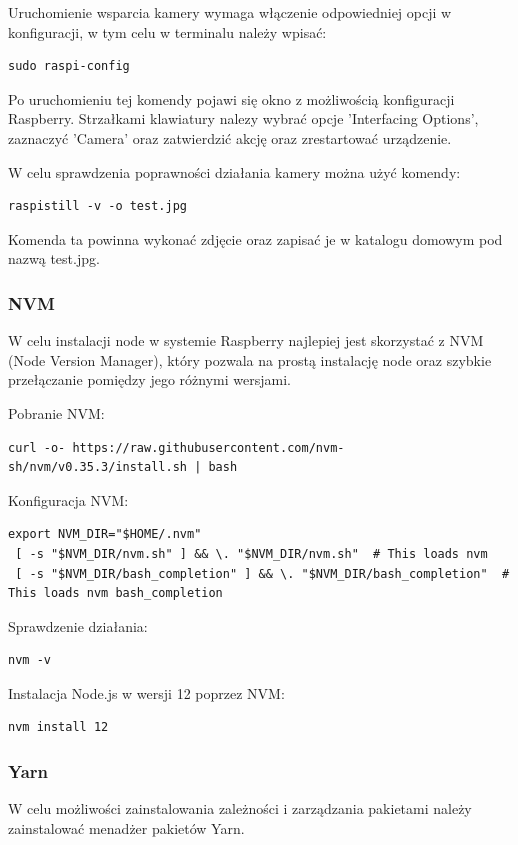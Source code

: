 Uruchomienie wsparcia kamery wymaga włączenie odpowiedniej opcji w konfiguracji, w tym celu w terminalu należy wpisać:

\begin{lstlisting}
sudo raspi-config
\end{lstlisting}

Po uruchomieniu tej komendy pojawi się okno z możliwością konfiguracji Raspberry. Strzałkami klawiatury nalezy wybrać opcje 'Interfacing Options',  zaznaczyć 'Camera' oraz zatwierdzić akcję oraz zrestartować urządzenie.

W celu sprawdzenia poprawności działania kamery można użyć komendy:

\begin{lstlisting}
raspistill -v -o test.jpg
\end{lstlisting}

Komenda ta powinna wykonać zdjęcie oraz zapisać je w katalogu domowym pod nazwą test.jpg.

\subsubsection{NVM}

W celu instalacji node w systemie Raspberry najlepiej jest skorzystać z NVM (Node Version Manager), który pozwala na prostą instalację node oraz szybkie przełączanie pomiędzy jego różnymi wersjami.

Pobranie NVM:
\begin{lstlisting}[breaklines=true]
curl -o- https://raw.githubusercontent.com/nvm-sh/nvm/v0.35.3/install.sh | bash
\end{lstlisting}

Konfiguracja NVM:
\begin{lstlisting}[breaklines=true]
export NVM_DIR="$HOME/.nvm"
 [ -s "$NVM_DIR/nvm.sh" ] && \. "$NVM_DIR/nvm.sh"  # This loads nvm
 [ -s "$NVM_DIR/bash_completion" ] && \. "$NVM_DIR/bash_completion"  # This loads nvm bash_completion
\end{lstlisting}

Sprawdzenie działania:
\begin{lstlisting}
nvm -v
\end{lstlisting}

Instalacja Node.js w wersji 12 poprzez NVM:
\begin{lstlisting}
nvm install 12
\end{lstlisting}

\subsubsection{Yarn}
W celu możliwości zainstalowania zależności i zarządzania pakietami należy zainstalować menadżer pakietów Yarn.

